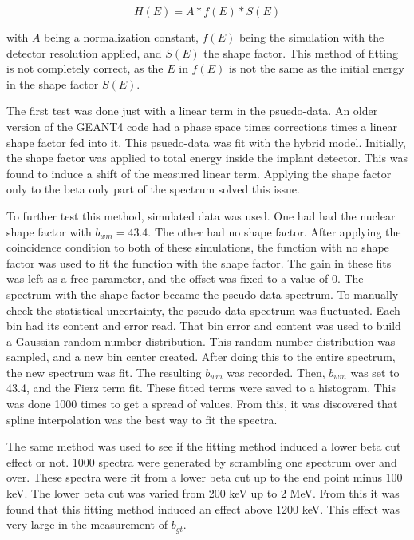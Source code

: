 \documentclass[main.tex]{subfiles}
\begin{document}
\begin{equation}
	H(E) = A * f(E) * S(E)
	\label{eq:hybridmodel}
\end{equation}

with $A$ being a normalization constant, $f(E)$ being the simulation with the detector resolution applied, and $S(E)$ the shape factor. 
This method of fitting is not completely correct, as the $E$ in $f(E)$ is not the same as the initial energy in the shape factor $S(E)$. 

The first test was done just with a linear term in the psuedo-data.
An older version of the GEANT4 code had a phase space times corrections times a linear shape factor fed into it.
This psuedo-data was fit with the hybrid model.
Initially, the shape factor was applied to total energy inside the implant detector.
This was found to induce a shift of the measured linear term.
Applying the shape factor only to the beta only part of the spectrum solved this issue. 

To further test this method, simulated data was used. 
One had had the nuclear shape factor with $b_{wm} = 43.4$.  
The other had no shape factor.
After applying the coincidence condition to both of these simulations, the function with no shape factor was used to fit the function with the shape factor. 
The gain in these fits was left as a free parameter, and the offset was fixed to a value of 0. 
The spectrum with the shape factor became the pseudo-data spectrum.
To manually check the statistical uncertainty, the pseudo-data spectrum was fluctuated.
Each bin had its content and error read. 
That bin error and content was used to build a Gaussian random number distribution.
This random number distribution was sampled, and a new bin center created.
After doing this to the entire spectrum, the new spectrum was fit.
The resulting $b_{wm}$ was recorded.
Then, $b_{wm}$ was set to 43.4, and the Fierz term fit. 
These fitted terms were saved to a histogram.
This was done 1000 times to get a spread of values.
From this, it was discovered that spline interpolation was the best way to fit the spectra.

The same method was used to see if the fitting method induced a lower beta cut effect or not. 
1000 spectra were generated by scrambling one spectrum over and over.
These spectra were fit from a lower beta cut up to the end point minus 100 keV.
The lower beta cut was varied from 200 keV up to 2 MeV.
From this it was found that this fitting method induced an effect above 1200 keV.
This effect was very large in the measurement of $b_{gt}$.
\end{document}
